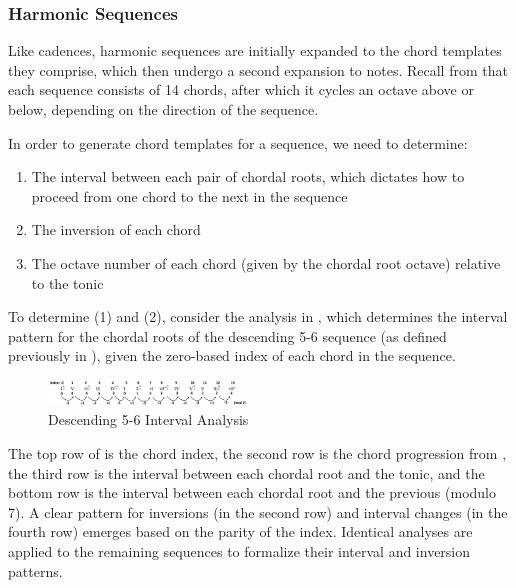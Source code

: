 \documentclass{article}
\begin{document}
\subsubsection{Harmonic Sequences}
Like cadences, harmonic sequences are initially expanded to the chord templates they comprise, which then undergo a second expansion to notes. Recall from  that each sequence consists of 14 chords, after which it cycles an octave above or below, depending on the direction of the sequence.

In order to generate chord templates for a sequence, we need to determine:

\begin{enumerate}
\itemsep0pt 
\item The interval between each pair of chordal roots, which dictates how to proceed from one chord to the next in the sequence
\item The inversion of each chord
\item The octave number of each chord (given by the chordal root octave) relative to the tonic
\end{enumerate}


To determine (1) and (2), consider the analysis in , which determines the interval pattern for the chordal roots of the descending 5-6 sequence (as defined previously in ), given the zero-based index of each chord in the sequence.


\begin{figure}[!htbp]
\centering
\includegraphics[width=0.47\textwidth]{images/desc_56_intervals}
  \caption{Descending 5-6 Interval Analysis}\label{fig:desc_56_intervals}
  \vspace{-3mm}
\end{figure}


The top row of  is the chord index, the second row is the chord progression from , the third row is the interval between each chordal root and the tonic, and the bottom row is the interval between each chordal root and the previous (modulo 7). A clear pattern for inversions (in the second row) and interval changes (in the fourth row) emerges based on the parity of the index. Identical analyses are applied to the remaining sequences to formalize their interval and inversion patterns.
\end{document}

